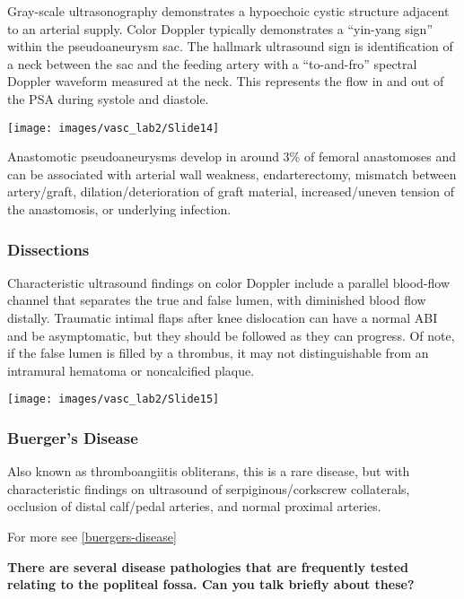 \documentclass[
]{book}
\begin{document}
Gray-scale ultrasonography demonstrates a hypoechoic cystic structure
adjacent to an arterial supply. Color Doppler typically demonstrates a
``yin-yang sign'' within the pseudoaneurysm sac. The hallmark ultrasound
sign is identification of a neck between the sac and the feeding artery
with a ``to-and-fro'' spectral Doppler waveform measured at the neck. This
represents the flow in and out of the PSA during systole and diastole.

\texttt{[image: images/vasc\_lab2/Slide14]}

Anastomotic pseudoaneurysms develop in around 3\% of femoral anastomoses
and can be associated with arterial wall weakness, endarterectomy,
mismatch between artery/graft, dilation/deterioration of graft material,
increased/uneven tension of the anastomosis, or underlying
infection.\citep{pellerito2019}

\hypertarget{dissections}{%
\subsubsection{Dissections}\label{dissections}}

Characteristic ultrasound findings on color Doppler include a parallel
blood-flow channel that separates the true and false lumen, with
diminished blood flow distally.\citep{ge2015, kobayashi2018} Traumatic
intimal flaps after knee dislocation can have a normal ABI and be
asymptomatic, but they should be followed as they can
progress.\citep{gaitini2008} Of note, if the false lumen is filled by a
thrombus, it may not distinguishable from an intramural hematoma or
noncalcified plaque.

\texttt{[image: images/vasc\_lab2/Slide15]}

\hypertarget{buerger}{%
\subsubsection{Buerger's Disease}\label{buerger}}

Also known as thromboangiitis obliterans, this is a rare disease, but
with characteristic findings on ultrasound of serpiginous/corkscrew
collaterals, occlusion of distal calf/pedal arteries, and normal
proximal arteries.\citep{busch2011, fujii2011}

For more see \ref{buergers-disease}

\textbf{There are several disease pathologies that are frequently tested
relating to the popliteal fossa. Can you talk briefly about these?}
\end{document}
